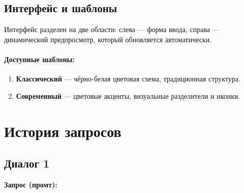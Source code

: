 \documentclass[a4paper, 14pt]{extarticle} %
\begin{document}
\subsection*{Интерфейс и шаблоны}
Интерфейс разделен на две области: слева --- форма ввода, справа --- динамический предпросмотр, который обновляется автоматически.

\paragraph{Доступные шаблоны:}
\begin{enumerate}
    \item \textbf{Классический} --- чёрно-белая цветовая схема, традиционная структура.
    \item \textbf{Современный} --- цветовые акценты, визуальные разделители и иконки.
\end{enumerate}

    \newpage 
    \section{История запросов}

\subsection*{Диалог 1}

\textbf{Запрос (промт):}
\end{document}
